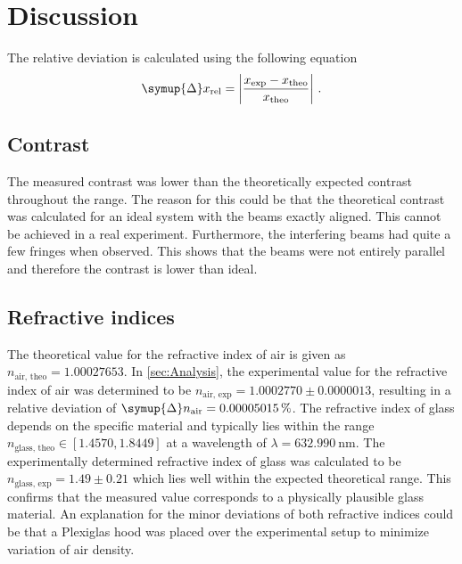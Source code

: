 \section{Discussion}
\label{sec:Discussion}
The relative deviation is calculated using the following equation
\begin{equation*}
    \symup{\Delta} x_{\text{rel}} = \left| \frac{x_{\text{exp}} - x_{{\text{theo}}}}{x_{{\text{theo}}}}\right|\,.
\end{equation*}
\subsection{Contrast}
The measured contrast was lower than the theoretically expected contrast throughout the range. The reason for this could be 
that the theoretical contrast was calculated for an ideal system with the beams exactly aligned. This cannot be achieved in 
a real experiment. Furthermore, the interfering beams had quite a few fringes when observed. This shows that the beams 
were not entirely parallel and therefore the contrast is lower than ideal. 

\subsection{Refractive indices}
The theoretical value for the refractive index of air is given as $n_{\text{air, theo}}=1.00027653$. 
In \autoref{sec:Analysis}, the experimental value for the refractive index of air was determined to be 
$n_{\text{air, exp}} = 1.0002770\pm0.0000013$, resulting in a relative deviation of $\symup{\Delta}n_{\text{air}} = 0.00005015\,\%$. 
The refractive index of 
glass depends on the specific material and typically lies within the range $n_{\text{glass, theo}}\in [1.4570, 1.8449]$ at a 
wavelength of $\lambda = \SI{632.990}{\nano\meter}$. 
The experimentally determined refractive index of glass was calculated to be $n_{\text{glass, exp}} = 1.49\pm0.21$ which lies 
well within the expected theoretical range. 
This confirms that the measured value corresponds to a physically plausible glass material.
An explanation for the minor deviations of both refractive indices could be that a Plexiglas hood was placed over the 
experimental setup to minimize 
variation of air density.